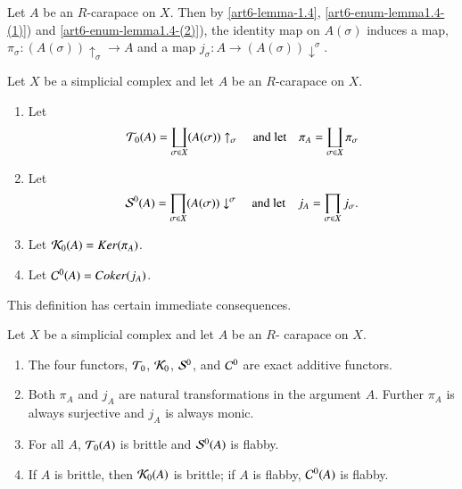 Let $A$ be an $R$-carapace on $X$. Then by \ref{art6-lemma-1.4}, \ref{art6-enum-lemma1.4-(1)}) and \ref{art6-enum-lemma1.4-(2)}), the identity map on $A(\sigma)$ induces a map, $\pi_{\sigma} : (A(\sigma))\uparrow_{\sigma} \rightarrow A$ and a map $j_{\sigma} : A\rightarrow (A(\sigma))\downarrow^{\sigma}$.  

\begin{definition}\label{art6-definition-7.1}
Let $X$ be a simplicial complex and let $A$ be an $R$-carapace on $X$.
    \begin{enumerate}[(1)]
    \item Let
        $$
        \mathcal{T}_{0}(A) = \coprod_{\sigma \in X}(A(\sigma))\uparrow_{\sigma} \quad \text{and let} \quad \pi_{A}= \coprod_{\sigma \in X}\pi_{\sigma} 
        $$\label{art6-definition7.1-enum-1}
        
    \item Let
        $$
        \mathcal{S}^{0}(A) = \prod_{\sigma \in X}(A(\sigma))\downarrow^{\sigma} \quad \text{and let} \quad j_{A}= \prod_{\sigma \in X}j_{\sigma}.
        $$\label{art6-definition7.1-enum-2}

     \item Let $\mathcal{K}_{0}(A) = Ker(\pi_{A})$.\label{art6-definition7.1-enum-3}
     \item Let $\mathcal{C}^{0}(A) = Coker(j_{A})$.\label{art6-definition7.1-enum-4}  
    \end{enumerate}

    This definition has certain immediate consequences.
\end{definition}

\begin{lemma}\label{art6-lemma-7.2}
 Let $X$ be a simplicial complex and let $A$ be an $R$- carapace on $X$.
\begin{enumerate}[(1)]
\item The four functors, $\mathcal{T}_{0}$, $\mathcal{K}_{0}$, $\mathcal{S}^{0}$, and $\mathcal{C}^{0}$ are exact additive functors.\label{art6-lemma7.2-enum-1}
\item Both $\pi_{A}$ and $j_{A}$ are natural transformations in the argument $A$. Further $\pi_{A}$ is always surjective and $j_{A}$ is always monic.\label{art6-lemma7.2-enum-2}

\item For all $A$, $\mathcal{T}_{0}(A)$ is brittle and $\mathcal{S}^{0}(A)$ is flabby.\label{art6-lemma7.2-enum-3}
\item If $A$ is brittle, then $\mathcal{K}_{0}(A)$ is brittle; if $A$ is flabby, $\mathcal{C}^{0}(A)$ is flabby.\label{art6-lemma7.2-enum-4}
\end{enumerate}
\end{lemma}


